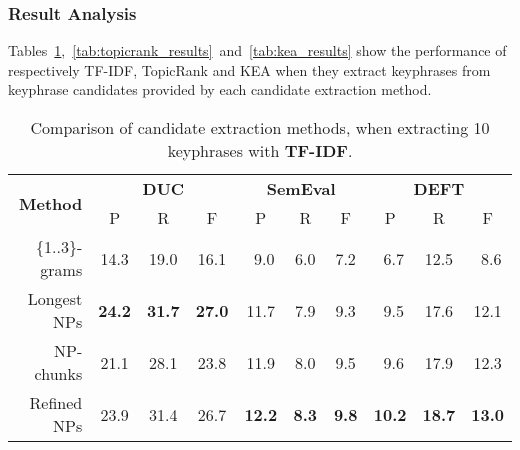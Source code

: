     \subsubsection{Result Analysis}
    \label{subsubsec:candidate_extraction_result_analysis}
      Tables~\ref{tab:tfidf_results},~\ref{tab:topicrank_results}~and~\ref{tab:kea_results}
      show the performance of respectively TF-IDF, TopicRank and KEA when
      they extract keyphrases from keyphrase candidates provided by each
      candidate extraction method.
      \begin{table}
        \centering
        \begin{tabular}{rccccccccc}
          \toprule
          \multirow{2}{*}[-2pt]{\textbf{Method}} & \multicolumn{3}{c}{\textbf{DUC}} & \multicolumn{3}{c}{\textbf{SemEval}} & \multicolumn{3}{c}{\textbf{DEFT}}\\
          \cmidrule(r){2-4}\cmidrule(lr){5-7}\cmidrule(l){8-10}
          & P & R & F & P & R & F & P & R & F\\
          \midrule
          \{1..3\}-grams & 14.3 & 19.0 & 16.1 & $~~$9.0 & $~~$6.0 & $~~$7.2 & $~~$6.7 & 12.5 & $~~$8.6\\
          Longest NPs & \textbf{24.2} & \textbf{31.7} & \textbf{27.0} & 11.7 & $~~$7.9 & $~~$9.3 & $~~$9.5 & 17.6 & 12.1\\
          NP-chunks & 21.1 & 28.1 & 23.8 & 11.9 & $~~$8.0 & $~~$9.5 & $~~$9.6 & 17.9 & 12.3\\
          Refined NPs & 23.9 & 31.4 & 26.7 & \textbf{12.2} & \textbf{$~~$8.3} & \textbf{$~~$9.8} & \textbf{10.2} & \textbf{18.7} & \textbf{13.0}\\
          \bottomrule
        \end{tabular}
        \caption{Comparison of candidate extraction methods, when extracting 10
                 keyphrases with \textbf{TF-IDF}.
                 \label{tab:tfidf_results}}
      \end{table}
